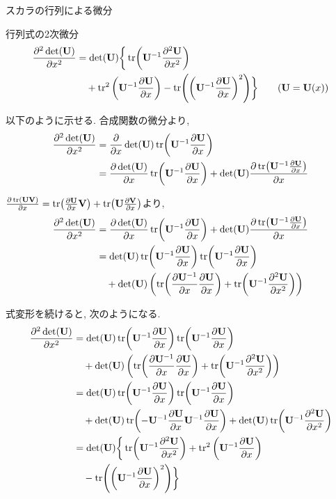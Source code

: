 \documentclass[dvipdfmx,notheorems,t]{beamer}
\begin{document}
\begin{frame}{スカラの行列による微分}
\begin{block}{行列式の2次微分}
  \begin{align*}
    \pdv[2]{\det(\vb{U})}{x} &= \det(\vb{U}) \bigg\{
      \tr(\vb{U}^{-1} \pdv[2]{\vb{U}}{x}) \\
      & \quad + \tr^2 \left( \vb{U}^{-1} \pdv{\vb{U}}{x} \right)
      - \tr(\left( \vb{U}^{-1} \pdv{\vb{U}}{x} \right)^2) \bigg\}
      \quad \quad \text{($\vb{U} = \vb{U}(x)$)}
  \end{align*}
\end{block}

以下のように示せる.
合成関数の微分より,
\begin{align*}
  \pdv[2]{\det(\vb{U})}{x} &= \pdv{x} \det(\vb{U}) \tr(\vb{U}^{-1} \pdv{\vb{U}}{x}) \\
    &= \pdv{\det(\vb{U})}{x} \tr(\vb{U}^{-1} \pdv{\vb{U}}{x})
      + \det(\vb{U}) \pdv{\tr(\vb{U}^{-1} \pdv{\vb{U}}{x})}{x}
\end{align*}

$\pdv{\tr(\vb{U} \vb{V})}{x} = \tr(\pdv{\vb{U}}{x} \vb{V}) + \tr(\vb{U} \pdv{\vb{V}}{x})$より,
\begin{align*}
    \pdv[2]{\det(\vb{U})}{x}
    &= \pdv{\det(\vb{U})}{x} \tr(\vb{U}^{-1} \pdv{\vb{U}}{x})
      + \det(\vb{U}) \pdv{\tr(\vb{U}^{-1} \pdv{\vb{U}}{x})}{x} \\
    &= \det(\vb{U}) \tr(\vb{U}^{-1} \pdv{\vb{U}}{x}) \tr(\vb{U}^{-1} \pdv{\vb{U}}{x}) \\
      & \quad + \det(\vb{U}) \left( \tr(\pdv{\vb{U}^{-1}}{x} \pdv{\vb{U}}{x})
      + \tr(\vb{U}^{-1} \pdv[2]{\vb{U}}{x}) \right)
\end{align*}
\newpage

式変形を続けると, 次のようになる.
\begin{align*}
  \pdv[2]{\det(\vb{U})}{x}
    &= \det(\vb{U}) \tr(\vb{U}^{-1} \pdv{\vb{U}}{x}) \tr(\vb{U}^{-1} \pdv{\vb{U}}{x}) \\
      & \quad + \det(\vb{U}) \left( \tr(\pdv{\vb{U}^{-1}}{x} \pdv{\vb{U}}{x})
      + \tr(\vb{U}^{-1} \pdv[2]{\vb{U}}{x}) \right) \\
    &= \det(\vb{U}) \tr(\vb{U}^{-1} \pdv{\vb{U}}{x}) \tr(\vb{U}^{-1} \pdv{\vb{U}}{x}) \\
      & \quad + \det(\vb{U}) \tr(-\vb{U}^{-1} \pdv{\vb{U}}{x} \vb{U}^{-1} \pdv{\vb{U}}{x})
      + \det(\vb{U}) \tr(\vb{U}^{-1} \pdv[2]{\vb{U}}{x}) \\
    &= \det(\vb{U}) \bigg\{ \tr(\vb{U}^{-1} \pdv[2]{\vb{U}}{x})
      + \tr^2 \left(\vb{U}^{-1} \pdv{\vb{U}}{x} \right) \\
      & \quad - \tr(\left( \vb{U}^{-1} \pdv{\vb{U}}{x} \right)^2) \bigg\}
\end{align*}
\end{frame}
\end{document}
